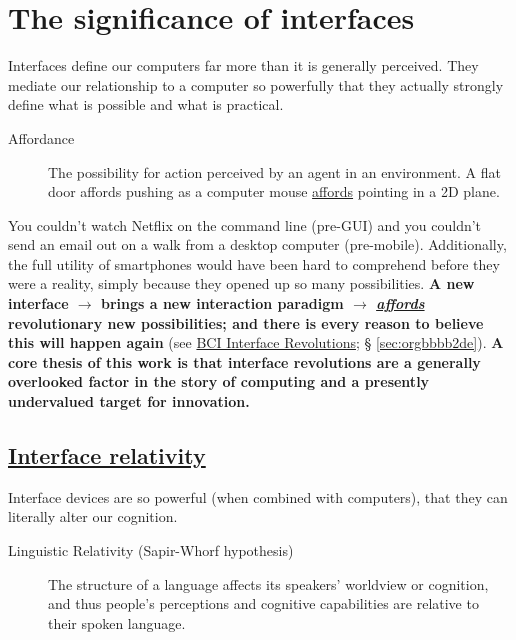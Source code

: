 \documentclass[logo,bsc,singlespacing,parskip]{infthesis}
\begin{document}
\section{The significance of interfaces}
\label{sec:orgb51491d}
Interfaces define our computers far more than it is generally perceived.
They mediate our relationship to a computer so powerfully that they actually strongly define what is possible and what is practical.

\begin{mdframed}
\begin{description}
\item[{\label{org12d3542}Affordance}] The possibility for action perceived by an agent in an environment. A flat door \label{orga95a77e}affords pushing as a computer mouse \hyperref[orga95a77e]{affords} pointing in a 2D plane.
\end{description}
\end{mdframed}

You couldn't watch Netflix on the command line (pre-GUI) and you couldn't send an email out on a walk from a desktop computer (pre-mobile).
Additionally, the full utility of smartphones would have been hard to comprehend before they were a reality, simply because they opened up so many possibilities.
\textbf{A new interface \(\rightarrow\) brings a new interaction paradigm \(\rightarrow\) \emph{\hyperref[orga95a77e]{affords}} revolutionary new possibilities; and there is every reason to believe this will happen again} (see \hyperref[sec:orgbbbb2de]{BCI Interface Revolutions}; § \ref{sec:orgbbbb2de}).
\textbf{A core thesis of this work is that interface revolutions are a generally overlooked factor in the story of computing and a presently undervalued target for innovation.}
\subsection{\hyperref[orga30ac29]{Interface relativity}}
\label{sec:org27af83d}
Interface devices are so powerful (when combined with computers), that they can literally alter our cognition.

\begin{mdframed}
\begin{description}
\item[{Linguistic Relativity (Sapir-Whorf hypothesis)}] The structure of a language affects its speakers' worldview or cognition, and thus people's perceptions and cognitive capabilities are relative to their spoken language.
\end{description}
\end{mdframed}
\end{document}
